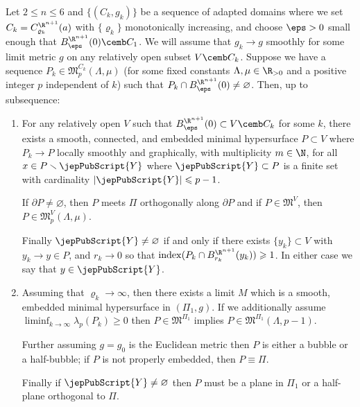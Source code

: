         	 	\begin{lem}\label{lemma:local}
        	 		Let $2\leqslant n \leqslant 6$ and $\{(C_{k}, g_k)\}$ be a sequence of adapted domains where we set $C_k=C^{\R^{n+1}}_{\varrho_k}(a)$ with $\{\varrho_k\}$ monotonically increasing, and choose $\eps >0$ small enough that $B^{\R^{n+1}}_\eps(0)\cemb C_1$. We will assume that $g_k\to g$ smoothly for some limit metric $g$ on any relatively open subset $V\cemb C_k$. Suppose we have a sequence $P_k\in \mathfrak{M}^{C_k}_p(\Lambda,\mu)$ (for some fixed constants $\Lambda, \mu\in \R_{>0}$ and a positive integer $p$ independent of $k$) such that $P_k\cap B^{\R^{n+1}}_{\eps}(0)\neq \varnothing$.
        	 		Then, up to subsequence: 
        	 		
        	 		
        	 		\begin{enumerate}
        	 			\item For any relatively open $V$ such that $B_\eps^{\R^{n+1}}(0)\subset V\cemb C_k$ for some $k$, there exists a smooth, connected, and embedded minimal hypersurface $P\subset V$ where $P_k \to P$ locally smoothly and graphically, with multiplicity $m\in \N$, for all $x\in P\smallsetminus {\jepPubScript{Y}}$ where ${\jepPubScript{Y}}\subset P$ is a finite set with cardinality $|{\jepPubScript{Y}}|\leqslant p-1$. 
        	 			
        	 			 If $\partial P\neq\varnothing$, then $P$ meets $\Pi$ orthogonally along $\partial P$ and if $P \in \mathfrak{M}^V$, then $P \in \mathfrak{M}^V_p(\Lambda,\mu)$.
        	 			 
        	 			  Finally ${\jepPubScript{Y}}\neq \varnothing$ if and only if there exists $\{y_k\}\subset V$ with $y_k\to y\in P$, and $r_k\to 0$ so that $\operatorname{index}(P_k\cap B^{\R^{n+1}}_{r_k}(y_k))\geqslant 1$. In either case we say that $y\in {\jepPubScript{Y}}$. 
        	 			
        	 			
        	 			
        	 			\item Assuming that $\varrho_k \to \infty$, then there exists a limit $M$ which is a smooth, embedded  minimal hypersurface in $(\Pi_1,g)$.   
        	 		If we additionally assume $\liminf_{k\to\infty}\lambda_p(P_k)\geqslant 0$ then  $P \in \mathfrak{M}^{\Pi_1}$ implies $P \in \mathfrak{M}^{\Pi_1}(\Lambda,p-1)$.
        	 			
        	 			Further assuming $g=g_0$ is the Euclidean metric then $P$ is either a bubble or a half-bubble; if $P$ is not properly embedded, then $P\equiv \Pi$. 
        	 			
        	 			Finally if ${\jepPubScript{Y}}\neq \varnothing$ then $P$ must be a plane in $\Pi_1$ or a half-plane orthogonal to $\Pi$. 
        	 			
        	 		\end{enumerate}
        	 		
        	 	\end{lem}
        	 	
